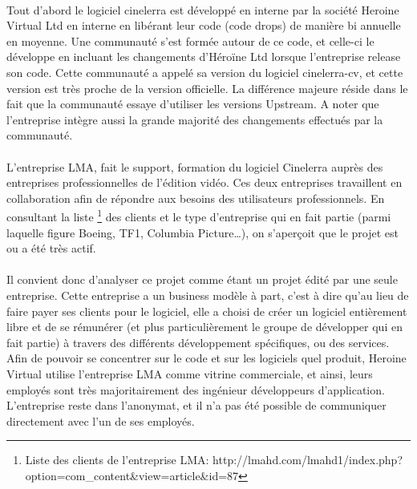 \paragraph{}

Tout d'abord le logiciel cinelerra est développé en interne par
la société Heroine Virtual Ltd en interne en libérant leur code
(code drops) de manière bi annuelle en moyenne. Une communauté s'est
formée autour de ce code, et celle-ci le développe en incluant les
changements d'Héroïne Ltd lorsque l'entreprise release son code. Cette
communauté a appelé sa version du logiciel cinelerra-cv, et cette
version est très proche de la version officielle. La différence majeure
réside dans le fait que la communauté essaye d'utiliser les versions
Upstream. A noter que l'entreprise intègre aussi la grande majorité
des changements effectués par la communauté.

\paragraph{}

L'entreprise LMA, fait le support, formation du logiciel Cinelerra
auprès des entreprises professionnelles de l'édition vidéo. Ces deux
entreprises travaillent en collaboration afin de répondre aux besoins
des utilisateurs professionnels. En consultant la liste \footnote{Liste
des clients de l'entreprise LMA:
  http://lmahd.com/lmahd1/index.php?option=com\_content\&view=article\&id=87}
des clients et le type d'entreprise qui en fait partie (parmi laquelle
figure Boeing, TF1, Columbia Picture\ldots), on s'aperçoit que le projet
est ou a été très actif.

\paragraph{}

Il convient donc d'analyser ce projet comme étant un projet édité par
une seule entreprise. Cette entreprise a un business modèle à part,
c'est à dire qu'au lieu de faire payer ses clients pour le logiciel, elle
a choisi de créer un logiciel entièrement libre et de se rémunérer
(et plus particulièrement le groupe de développer qui en fait partie) à
travers des différents développement spécifiques, ou des services. Afin
de pouvoir se concentrer sur le code et sur les logiciels quel produit,
Heroine Virtual utilise l'entreprise LMA comme vitrine commerciale,
et ainsi, leurs employés sont très majoritairement des ingénieur
développeurs d'application.  L'entreprise reste dans l'anonymat,
et il n'a pas été possible de communiquer directement avec l'un de
ses employés.

